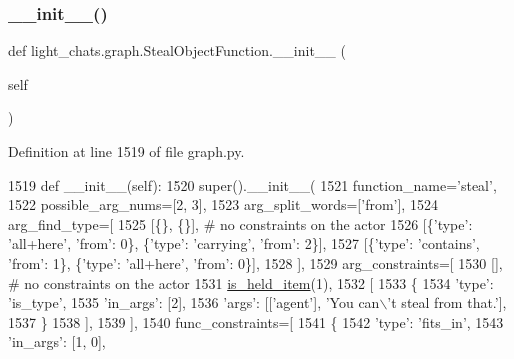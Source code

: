 \subsubsection{\texorpdfstring{\+\_\+\+\_\+init\+\_\+\+\_\+()}{\_\_init\_\_()}}
{\footnotesize\ttfamily def light\+\_\+chats.\+graph.\+Steal\+Object\+Function.\+\_\+\+\_\+init\+\_\+\+\_\+ (\begin{DoxyParamCaption}\item[{}]{self }\end{DoxyParamCaption})}



Definition at line 1519 of file graph.\+py.


\begin{DoxyCode}
1519     \textcolor{keyword}{def }\_\_init\_\_(self):
1520         super().\_\_init\_\_(
1521             function\_name=\textcolor{stringliteral}{'steal'},
1522             possible\_arg\_nums=[2, 3],
1523             arg\_split\_words=[\textcolor{stringliteral}{'from'}],
1524             arg\_find\_type=[
1525                 [\{\}, \{\}],  \textcolor{comment}{# no constraints on the actor}
1526                 [\{\textcolor{stringliteral}{'type'}: \textcolor{stringliteral}{'all+here'}, \textcolor{stringliteral}{'from'}: 0\}, \{\textcolor{stringliteral}{'type'}: \textcolor{stringliteral}{'carrying'}, \textcolor{stringliteral}{'from'}: 2\}],
1527                 [\{\textcolor{stringliteral}{'type'}: \textcolor{stringliteral}{'contains'}, \textcolor{stringliteral}{'from'}: 1\}, \{\textcolor{stringliteral}{'type'}: \textcolor{stringliteral}{'all+here'}, \textcolor{stringliteral}{'from'}: 0\}],
1528             ],
1529             arg\_constraints=[
1530                 [],  \textcolor{comment}{# no constraints on the actor}
1531                 \hyperlink{namespacelight__chats_1_1graph_aa0be6ee7e9f549a7195bea9dfb962ad6}{is\_held\_item}(1),
1532                 [
1533                     \{
1534                         \textcolor{stringliteral}{'type'}: \textcolor{stringliteral}{'is\_type'},
1535                         \textcolor{stringliteral}{'in\_args'}: [2],
1536                         \textcolor{stringliteral}{'args'}: [[\textcolor{stringliteral}{'agent'}], \textcolor{stringliteral}{'You can\(\backslash\)'t steal from that.'}],
1537                     \}
1538                 ],
1539             ],
1540             func\_constraints=[
1541                 \{
1542                     \textcolor{stringliteral}{'type'}: \textcolor{stringliteral}{'fits\_in'},
1543                     \textcolor{stringliteral}{'in\_args'}: [1, 0],

\end{DoxyCode}
